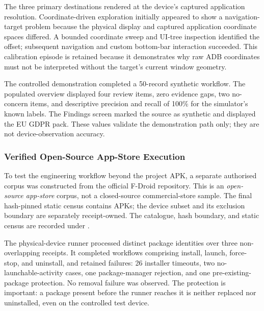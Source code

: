 The three primary destinations rendered at the device's captured application resolution. Coordinate-driven exploration initially appeared to show a navigation-target problem because the physical display and captured application coordinate spaces differed. A bounded coordinate sweep and UI-tree inspection identified the offset; subsequent navigation and custom bottom-bar interaction succeeded. This calibration episode is retained because it demonstrates why raw ADB coordinates must not be interpreted without the target's current window geometry.

The controlled demonstration completed a 50-record synthetic workflow. The populated overview displayed four review items, zero evidence gaps, two no-concern items, and descriptive precision and recall of 100\% for the simulator's known labels. The Findings screen marked the source as synthetic and displayed the EU GDPR pack. These values validate the demonstration path only; they are not device-observation accuracy.

\subsubsection{Verified Open-Source App-Store Execution}

To test the engineering workflow beyond the project APK, a separate authorised corpus was constructed from the official F-Droid repository. This is an \emph{open-source app-store} corpus, not a closed-source commercial-store sample. The final hash-pinned static census contains \FDroidCensusN{} APKs; the device subset and its exclusion boundary are separately receipt-owned. The catalogue, hash boundary, and static census are recorded under \allowbreak{}.

The physical-device runner processed \DevicePackagesN{} distinct package identities over three non-overlapping receipts. It completed \CompletedWorkflowsN{} workflows comprising install, launch, force-stop, and uninstall, and retained \FailedDeviceWorkflowsN{} failures: 26 installer timeouts, two no-launchable-activity cases, one package-manager rejection, and one pre-existing-package protection. No removal failure was observed. The protection is important: a package present before the runner reaches it is neither replaced nor uninstalled, even on the controlled test device.


